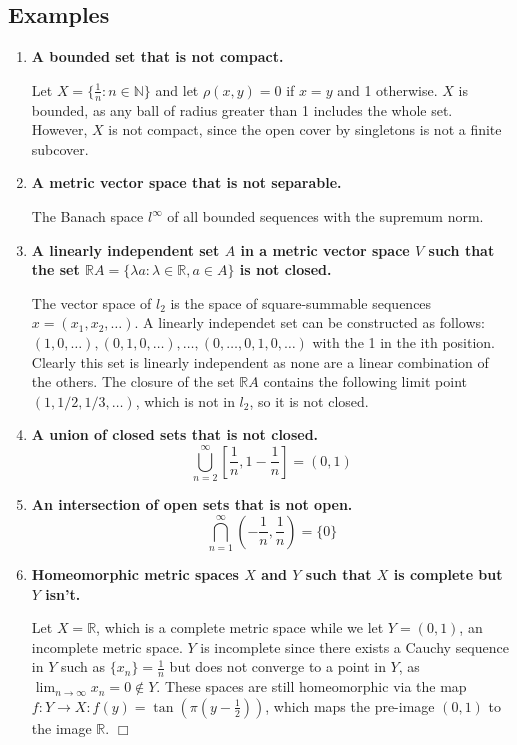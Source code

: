 \documentclass[12pt,letterpaper,reqno]{amsart}
\newcommand{\R}{\mathbb R}
\newcommand{\N}{\mathbb N}
\begin{document}
\subsection*{Examples}
\begin{enumerate}[1.]
\item \textbf{A bounded set that is not compact.}
\begin{flushleft}
    Let $X = \{ \frac{1}{n}: n \in \N\}$ and let $\rho(x,y) = 0$ if $x=y$ and 1 otherwise. $X$ is bounded, as any ball of radius greater than 1 includes the whole set. However, $X$ is not compact, since the open cover by singletons is not a finite subcover.
\end{flushleft}
\item \textbf{A metric vector space that is not separable.}
\begin{flushleft}
    The Banach space $l^\infty$ of all bounded sequences with the supremum norm.
\end{flushleft}
\vspace{.75in}
\item \textbf{A linearly independent set $A$ in a metric vector space $V$ such that the set $\R A=\{\lambda a : \lambda \in \R, a\in A\}$ is not closed.}
\begin{flushleft}
    The vector space of $l_2$ is the space of square-summable sequences $x = (x_1, x_2, \ldots)$. A linearly independet set can be constructed as follows: $(1, 0, \ldots), (0, 1, 0, \ldots), \ldots, (0, \ldots, 0, 1, 0, \ldots)$ with the 1 in the ith position. Clearly this set is linearly independent as none are a linear combination of the others. The closure of the set $\R A$ contains the following limit point $(1, 1/2, 1/3, \ldots)$, which is not in $l_2$, so it is not closed.
\end{flushleft}
\item \textbf{A union of closed sets that is not closed.}
$$\bigcup_{n=2}^\infty \left[ \frac{1}{n}, 1 - \frac{1}{n} \right] = (0,1)$$
\item \textbf{An intersection of open sets that is not open.}
$$\bigcap_{n=1}^\infty \left(-\frac{1}{n}, \frac{1}{n} \right) = \{0\}$$
\item \textbf{Homeomorphic metric spaces $X$ and $Y$ such that $X$ is complete but $Y$ isn't.}
\begin{flushleft}
    Let $X = \R$, which is a complete metric space while we let $Y = (0,1)$, an incomplete metric space. $Y$ is incomplete since there exists a Cauchy sequence in $Y$ such as $\{x_n\} = \frac{1}{n}$ but does not converge to a point in $Y$, as $\lim_{n\rightarrow\infty}x_n = 0 \not\in Y$. These spaces are still homeomorphic via the map $f:Y\rightarrow X: f(y) = \tan(\pi(y-\frac{1}{2}))$, which maps the pre-image $(0,1)$ to the image $\R$. $\Box$

\end{flushleft}
\end{enumerate}
\end{document}
